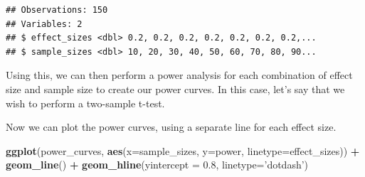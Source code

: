 \documentclass[12pt,]{book}
\newenvironment{Shaded}{\begin{snugshade}}{\end{snugshade}}
\newcommand{\CommentTok}[1]{\textcolor[rgb]{0.56,0.35,0.01}{\textit{#1}}}
\newcommand{\ControlFlowTok}[1]{\textcolor[rgb]{0.13,0.29,0.53}{\textbf{#1}}}
\newcommand{\DataTypeTok}[1]{\textcolor[rgb]{0.13,0.29,0.53}{#1}}
\newcommand{\FloatTok}[1]{\textcolor[rgb]{0.00,0.00,0.81}{#1}}
\newcommand{\KeywordTok}[1]{\textcolor[rgb]{0.13,0.29,0.53}{\textbf{#1}}}
\newcommand{\NormalTok}[1]{#1}
\newcommand{\OperatorTok}[1]{\textcolor[rgb]{0.81,0.36,0.00}{\textbf{#1}}}
\newcommand{\StringTok}[1]{\textcolor[rgb]{0.31,0.60,0.02}{#1}}
\begin{document}
\begin{verbatim}
## Observations: 150
## Variables: 2
## $ effect_sizes <dbl> 0.2, 0.2, 0.2, 0.2, 0.2, 0.2, 0.2,...
## $ sample_sizes <dbl> 10, 20, 30, 40, 50, 60, 70, 80, 90...
\end{verbatim}

Using this, we can then perform a power analysis for each combination of effect size and sample size to create our power curves. In this case, let's say that we wish to perform a two-sample t-test.

\begin{Shaded}
\end{Shaded}

Now we can plot the power curves, using a separate line for each effect size.

\begin{Shaded}
\begin{Highlighting}[]
\KeywordTok{ggplot}\NormalTok{(power_curves, }
       \KeywordTok{aes}\NormalTok{(}\DataTypeTok{x=}\NormalTok{sample_sizes,}
           \DataTypeTok{y=}\NormalTok{power, }
           \DataTypeTok{linetype=}\NormalTok{effect_sizes)) }\OperatorTok{+}\StringTok{ }
\StringTok{  }\KeywordTok{geom_line}\NormalTok{() }\OperatorTok{+}\StringTok{ }
\StringTok{  }\KeywordTok{geom_hline}\NormalTok{(}\DataTypeTok{yintercept =} \FloatTok{0.8}\NormalTok{, }
             \DataTypeTok{linetype=}\StringTok{'dotdash'}\NormalTok{)}
\end{Highlighting}
\end{Shaded}
\end{document}
